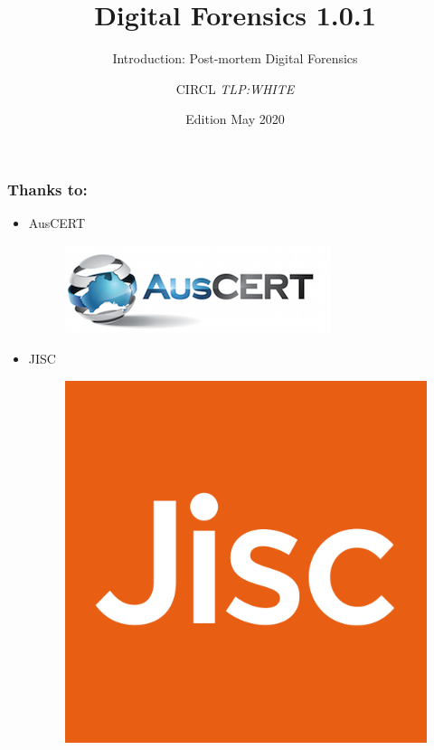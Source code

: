 \documentclass{beamer}
\author{CIRCL \emph{TLP:WHITE}}
\title{Digital Forensics 1.0.1}
\subtitle{Introduction: Post-mortem Digital Forensics}
\institute{info@circl.lu}
\date{Edition May 2020}
\begin{document}
\begin{frame}[t,plain]
\titlepage
\end{frame}

\begin{frame}
  \frametitle{Thanks to:}
  \begin{itemize}
  \item[] AusCERT
    \begin{figure}
        \includegraphics[scale=0.3, angle=0, trim=0 0 0 0]{images/auscert_logo.png}
    \end{figure}
  \item[] JISC
    \begin{figure}
        \includegraphics[scale=0.06, angle=0, trim=0 0 0 0]{images/jisc-logo.png}
    \end{figure}
  \end{itemize}
\end{frame}
\end{document}
